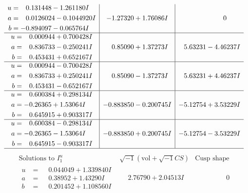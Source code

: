 \documentclass[1p]{elsarticle_modified}
\theoremstyle{definition}
\newcommand{\I}{\sqrt{-1}}
\begin{document}
$$\begin{array}{c|c|c}
\begin{aligned}
u &= \phantom{-}0.131448 - 1.261180 I \\
a &= \phantom{-}0.0126024 - 0.1044920 I \\
b &= -0.894097 - 0.065764 I\end{aligned}
 & -1.27320 + 1.76086 I & \phantom{-0.000000 } 0 \\ \hline\begin{aligned}
u &= \phantom{-}0.000944 + 0.700428 I \\
a &= \phantom{-}0.836733 - 0.250241 I \\
b &= \phantom{-}0.453431 + 0.652167 I\end{aligned}
 & \phantom{-}0.85090 + 1.37273 I & \phantom{-}5.63231 - 4.46237 I \\ \hline\begin{aligned}
u &= \phantom{-}0.000944 - 0.700428 I \\
a &= \phantom{-}0.836733 + 0.250241 I \\
b &= \phantom{-}0.453431 - 0.652167 I\end{aligned}
 & \phantom{-}0.85090 - 1.37273 I & \phantom{-}5.63231 + 4.46237 I \\ \hline\begin{aligned}
u &= \phantom{-}0.600384 + 0.298134 I \\
a &= -0.26365 + 1.53064 I \\
b &= \phantom{-}0.645915 + 0.903317 I\end{aligned}
 & -0.883850 - 0.200745 I & -5.12754 + 3.53229 I \\ \hline\begin{aligned}
u &= \phantom{-}0.600384 - 0.298134 I \\
a &= -0.26365 - 1.53064 I \\
b &= \phantom{-}0.645915 - 0.903317 I\end{aligned}
 & -0.883850 + 0.200745 I & -5.12754 - 3.53229 I\\
 \hline 
 \end{array}$$\newpage$$\begin{array}{c|c|c}  
\text{Solutions to }I^u_{1}& \I (\text{vol} + \sqrt{-1}CS) & \text{Cusp shape}\\
 \hline 
\begin{aligned}
u &= \phantom{-}0.044049 + 1.339840 I \\
a &= \phantom{-}0.38952 + 1.43290 I \\
b &= \phantom{-}0.201452 + 1.108560 I\end{aligned}
 & \phantom{-}2.76790 + 2.04513 I & \phantom{-0.000000 } 0 \\ \hline\begin{aligned}

\end{aligned}
\end{array}$$
\end{document}
